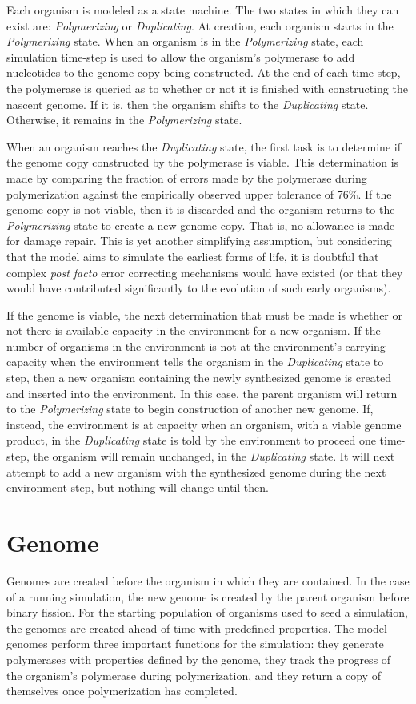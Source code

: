 Each organism is modeled as a state machine. The two states in which they can exist are: \emph{Polymerizing} or \emph{Duplicating}. At creation, each organism starts in the \emph{Polymerizing} state. When an organism is in the \emph{Polymerizing} state, each simulation time-step is used to allow the organism's polymerase to add nucleotides to the genome copy being constructed. At the end of each time-step, the polymerase is queried as to whether or not it is finished with constructing the nascent genome. If it is, then the organism shifts to the \emph{Duplicating} state. Otherwise, it remains in the \emph{Polymerizing} state.

When an organism reaches the \emph{Duplicating} state, the first task is to determine if the genome copy constructed by the polymerase is viable. This determination is made by comparing the fraction of errors made by the polymerase during polymerization against the empirically observed upper tolerance of 76\%. If the genome copy is not viable, then it is discarded and the organism returns to the \emph{Polymerizing} state to create a new genome copy. That is, no allowance is made for damage repair. This is yet another simplifying assumption, but considering that the model aims to simulate the earliest forms of life, it is doubtful that complex \emph{post facto} error correcting mechanisms would have existed (or that they would have contributed significantly to the evolution of such early organisms).

If the genome is viable, the next determination that must be made is whether or not there is available capacity in the environment for a new organism. If the number of organisms in the environment is not at the environment's carrying capacity when the environment tells the organism in the \emph{Duplicating} state to step, then a new organism containing the newly synthesized genome is created and inserted into the environment. In this case, the parent organism will return to the \emph{Polymerizing} state to begin construction of another new genome. If, instead, the environment is at capacity when an organism, with a viable genome product, in the \emph{Duplicating} state is told by the environment to proceed one time-step, the organism will remain unchanged, in the \emph{Duplicating} state. It will next attempt to add a new organism with the synthesized genome during the next environment step, but nothing will change until then.

\section*{Genome} %
\label{sec:genome}
Genomes are created before the organism in which they are contained. In the case of a running simulation, the new genome is created by the parent organism before binary fission. For the starting population of organisms used to seed a simulation, the genomes are created ahead of time with predefined properties. The model genomes perform three important functions for the simulation: they generate polymerases with properties defined by the genome, they track the progress of the organism's polymerase during polymerization, and they return a copy of themselves once polymerization has completed.

